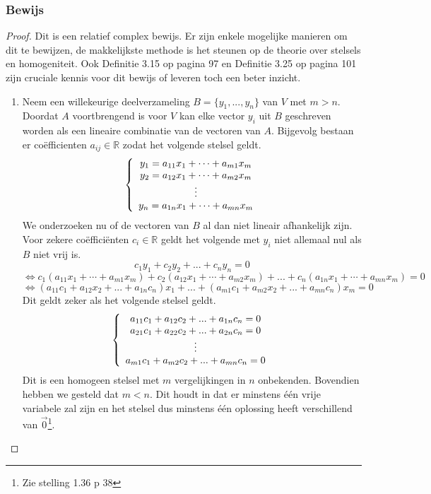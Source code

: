 \documentclass[lineaire_algebra_oplossingen.tex]{subfiles}
\begin{document}
\subsubsection*{Bewijs}
\begin{proof}
Dit is een relatief complex bewijs. Er zijn enkele mogelijke manieren om dit te bewijzen, de makkelijkste methode is het steunen op de theorie over stelsels en homogeniteit. Ook Definitie 3.15 op pagina 97 en Definitie 3.25 op pagina 101 zijn cruciale kennis voor dit bewijs of leveren toch een beter inzicht.\\
\begin{enumerate}
\item
Neem een willekeurige deelverzameling $B = \{y_1,...,y_n\}$ van $V$ met $m > n$.\\
Doordat $A$ voortbrengend is voor $V$ kan elke vector $y_i$ uit $B$ geschreven worden als een lineaire combinatie van de vectoren van $A$. Bijgevolg bestaan er co\"efficienten $a_{ij}\in \mathbb{R}$ zodat het volgende stelsel geldt.
\[
\left\lbrace
\begin{array}{c c}
y_1 = a_{11}x_1 + \cdots + a_{m1}x_m\\
y_2 = a_{12}x_1 + \cdots + a_{m2}x_m\\
\vdots\\
y_n = a_{1n}x_1 + \cdots + a_{mn}x_m\\
\end{array}
\right.
\]
We onderzoeken nu of de vectoren van $B$ al dan niet lineair afhankelijk zijn. Voor zekere co\"effici\"enten $c_i\in \mathbb{R}$ geldt het volgende met $y_i$ niet allemaal nul als $B$ niet vrij is.
\[
c_1y_1 + c_2y_2 + ... + c_ny_n = 0
\]
\[
\Leftrightarrow
c_1(a_{11}x_1 + \cdots + a_{m1}x_m) + c_2(a_{12}x_1 + \cdots + a_{m2}x_m) + ... + c_n(a_{1n}x_1 + \cdots + a_{mn}x_m) = 0
\]
\[
\Leftrightarrow
(a_{11}c_1+a_{12}x_2+...+a_{1n}c_n)x_1 + ... + (a_{m1}c_1+a_{m2}x_2+...+a_{mn}c_n)x_m = 0
\]
Dit geldt zeker als het volgende stelsel geldt.
\[
\left\{
\begin{array}{c c}
a_{11}c_1+a_{12}c_2+...+a_{1n}c_n = 0\\
a_{21}c_1+a_{22}c_2+...+a_{2n}c_n = 0\\
\vdots\\
a_{m1}c_1+a_{m2}c_2+...+a_{mn}c_n = 0\\
\end{array}
\right.
\]
Dit is een homogeen stelsel met $m$ vergelijkingen in $n$ onbekenden. Bovendien hebben we gesteld dat $m<n$. Dit houdt in dat er minstens \'e\'en vrije variabele zal zijn en het stelsel dus minstens \'e\'en oplossing heeft verschillend van $\vec{0}$\footnote{Zie stelling 1.36 p 38}.

\end{enumerate}
\end{proof}
\end{document}
